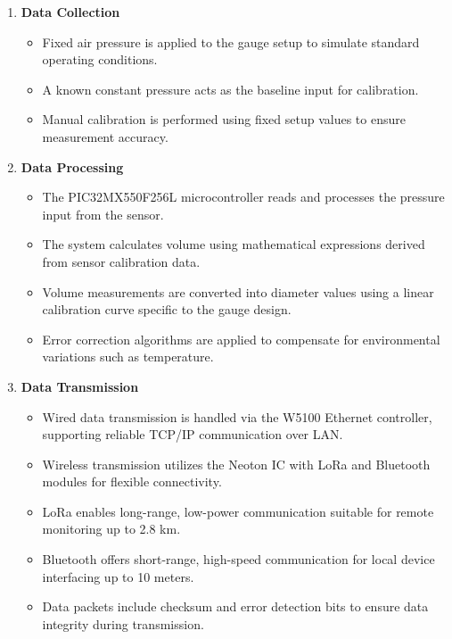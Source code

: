 \documentclass[12pt]{report}
\begin{document}
\begin{enumerate}[leftmargin=*]
    \item \textbf{Data Collection}
    \begin{itemize}[leftmargin=*]
        \item Fixed air pressure is applied to the gauge setup to simulate standard operating conditions.
        \item A known constant pressure acts as the baseline input for calibration.
        \item Manual calibration is performed using fixed setup values to ensure measurement accuracy.
    \end{itemize}
    
    \item \textbf{Data Processing}
    \begin{itemize}[leftmargin=*]
        \item The PIC32MX550F256L microcontroller reads and processes the pressure input from the sensor.
        \item The system calculates volume using mathematical expressions derived from sensor calibration data.
        \item Volume measurements are converted into diameter values using a linear calibration curve specific to the gauge design.
        \item Error correction algorithms are applied to compensate for environmental variations such as temperature.
    \end{itemize}
    
    \item \textbf{Data Transmission}
    \begin{itemize}[leftmargin=*]
        \item Wired data transmission is handled via the W5100 Ethernet controller, supporting reliable TCP/IP communication over LAN.
        \item Wireless transmission utilizes the Neoton IC with LoRa and Bluetooth modules for flexible connectivity.
        \item LoRa enables long-range, low-power communication suitable for remote monitoring up to 2.8 km.
        \item Bluetooth offers short-range, high-speed communication for local device interfacing up to 10 meters.
        \item Data packets include checksum and error detection bits to ensure data integrity during transmission.
    \end{itemize}
\end{enumerate}
\end{document}
